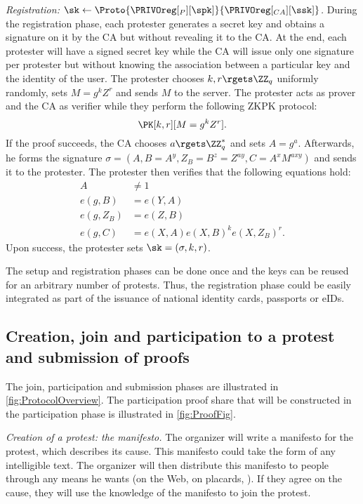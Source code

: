 
\emph{Registration: \(\sk\gets 
    \Proto{\PRIVOreg[_P][\spk]}{\PRIVOreg[_{CA}][\ssk]}\).}
During the registration phase, each protester generates a secret key and obtains a signature on it by the \ac{CA} but without revealing it to the \ac{CA}.
At the end, each protester will have a signed secret key while the \ac{CA} will issue only one signature per protester but without knowing the association between a particular key and the identity of the user.
The protester chooses \(k, r\rgets \ZZ_q\) uniformly randomly, sets \(M = g^k Z^r\) and sends \(M\) to the server.
The protester acts as prover and the \ac{CA} as verifier while they perform the following \ac{ZKPK} protocol:
\[
  \PK[k,r][M = g^k Z^r].
\]
If the proof succeeds, the \ac{CA} chooses \(a\rgets \ZZ_q^*\) and sets \(A = g^a\).
Afterwards, he forms the signature \(\sigma = (A, B = A^y, Z_B = B^z = Z^{ay}, C = A^x M^{axy})\) and sends it to the protester.
The protester then verifies that the following equations hold:
\begin{align*}
  A &\neq 1 \\
  e(g, B) &= e(Y, A) \\
  e(g, Z_B) &= e(Z, B) \\
  e(g, C) &= e(X, A) e(X, B)^k e(X, Z_B)^r.
\end{align*}
Upon success, the protester sets \(\sk = (\sigma, k, r)\).

The setup and registration phases can be done once and the keys can be reused for an arbitrary number of protests.
Thus, the registration phase could be easily integrated as part of the issuance of national identity cards, passports or \acp{eID}.

\subsection{Creation, join and participation to a protest and submission of proofs}%
\label{ProtocolDuring}

The join, participation and submission phases are illustrated in \cref{fig:ProtocolOverview}.
The participation proof share that will be constructed in the participation phase is illustrated in \cref{fig:ProofFig}.

\emph{Creation of a protest: the manifesto.}
The organizer will write a manifesto for the protest, which describes its cause.
This manifesto could take the form of any intelligible text.
The organizer will then distribute this manifesto to people through any means he wants (\eg on the Web, on placards, \etc).
If they agree on the cause, they will use the knowledge of the manifesto to join the protest.


